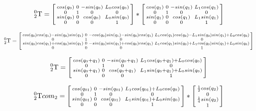\documentclass{article}
\begin{document}
\begin{equation}
 _{2}^{0}\textrm{T} = \begin{bsmallmatrix}
  cos(q_{0}) & 0 & -sin(q_{0}) & L_{0}cos(q_{0}) \\ 
  0 & 1 & 0 & 0 \\ 
  sin(q_{0}) & 0 & cos(q_{0}) & L_{0}sin(q_{0})\\ 
  0 & 0 & 0 & 1
\end{bsmallmatrix}*\begin{bsmallmatrix}
 cos(q_{1}) & 0 & -sin(q_{1}) & L_{1}cos(q_{1}) \\ 
 0 & 1 & 0 & 0 \\ 
 sin(q_{1}) & 0 & cos(q_{1}) & L_{1}sin(q_{1})\\ 
 0 & 0 & 0 & 1
\end{bsmallmatrix}
\end{equation}

\begin{equation}  
_{2}^{0}\textrm{T} = \begin{bsmallmatrix}
 cos(q_{0})cos(q_{1})-sin(q_{0})sin(q_{1}) & 0 & -cos(q_{0})sin(q_{1})-sin(q_{0})cos(q_{1}) & L_{1}cos(q_{1})cos(q_{0})-L_{1}sin(q_{0})sin(q_{1})+L_{0}cos(q_{0}) \\ 
 0 & 1 & 0 & 0 \\ 
 sin(q_{0})cos(q_{1})+cos(q_{0})sin(q_{1}) & 0 & -sin(q_{0})sin(q_{1})+cos(q_{0})cos(q_{1}) & L_{1}cos(q_{1})sin(q_{0}) + L_{1}cos(q_{0})sin(q_{1})+L_{0}sin(q_{0})\\ 
 0 & 0 & 0 & 1
\end{bsmallmatrix}
\end{equation}

\begin{equation}  
_{2}^{0}\textrm{T} = \begin{bsmallmatrix}
 cos(q_{0}+q_{1}) & 0 & -sin(q_{0}+q_{1}) & L_{1}cos(q_{0}+q_{1})+L_{0}cos(q_{0}) \\ 
 0 & 1 & 0 & 0 \\ 
 sin(q_{0}+q_{1}) & 0 & cos(q_{0}+q_{1}) & L_{1}sin(q_{0}+q_{1})+L_{0}sin(q_{0})\\ 
 0 & 0 & 0 & 1
\end{bsmallmatrix}
\end{equation}

\begin{equation}  
_{2}^{0}\textrm{T}com_{2} = \begin{bsmallmatrix}
 cos(q_{01}) & 0 & -sin(q_{01}) & L_{1}cos(q_{01})+L_{0}cos(q_{0}) \\ 
 0 & 1 & 0 & 0 \\ 
 sin(q_{01}) & 0 & cos(q_{01}) & L_{1}sin(q_{01})+L_{0}sin(q_{0})\\ 
 0 & 0 & 0 & 1
\end{bsmallmatrix}*\begin{bsmallmatrix}
 \frac{1}{2}cos(q_{2}) \\ 
 0 \\ 
 \frac{1}{4}sin(q_{2}) \\ 
 1
\end{bsmallmatrix}
\end{equation}
\end{document}
